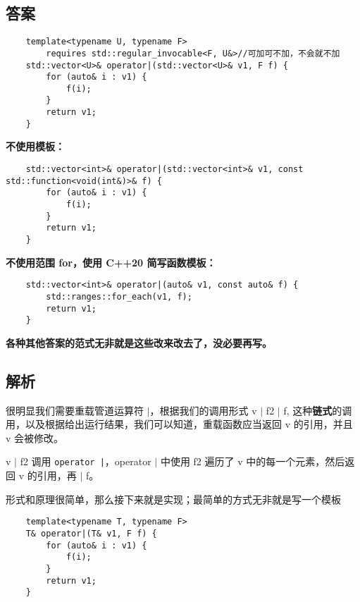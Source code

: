 

\subsection{答案}

\begin{verbatim}
    template<typename U, typename F>
        requires std::regular_invocable<F, U&>//可加可不加，不会就不加
    std::vector<U>& operator|(std::vector<U>& v1, F f) {
        for (auto& i : v1) {
            f(i);
        }
        return v1;
    }
\end{verbatim}

\textbf{不使用模板：}

\begin{verbatim}
    std::vector<int>& operator|(std::vector<int>& v1, const std::function<void(int&)>& f) {
        for (auto& i : v1) {
            f(i);
        }
        return v1;
    }
\end{verbatim}

\textbf{不使用范围 for，使用 C++20 简写函数模板：}

\begin{verbatim}
    std::vector<int>& operator|(auto& v1, const auto& f) {
        std::ranges::for_each(v1, f);
        return v1;
    }
\end{verbatim}

\textbf{各种其他答案的范式无非就是这些改来改去了，没必要再写。}

\subsection{解析}

很明显我们需要重载管道运算符 $|$，根据我们的调用形式 v $|$ f2 $|$ f,
这种\textbf{链式}的调用，以及根据给出运行结果，我们可以知道，重载函数应当返回 v 的引用，并且 v 会被修改。

v $|$ f2 调用 \texttt{operator |}，operator $|$ 中使用 f2 遍历了 v 中的每一个元素，然后返回 v 的引用，再 $|$ f。

形式和原理很简单，那么接下来就是实现；最简单的方式无非就是写一个模板

\begin{verbatim}
    template<typename T, typename F>
    T& operator|(T& v1, F f) {
        for (auto& i : v1) {
            f(i);
        }
        return v1;
    }
\end{verbatim}

